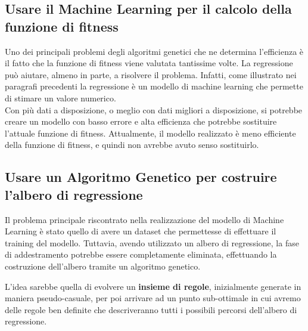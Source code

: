 \documentclass[a4paper, 11pt, oneside]{report}
\begin{document}
                \subsection{Usare il Machine Learning per il calcolo della funzione di fitness}
                Uno dei principali problemi degli algoritmi genetici che ne determina l'efficienza è il fatto che la funzione di fitness
                viene valutata tantissime volte.
                La regressione può aiutare, almeno in parte, a risolvere il problema.
                Infatti, come illustrato nei paragrafi precedenti la regressione è un modello di machine learning che permette di stimare
                un valore numerico.\\
                Con più dati a disposizione, o meglio con dati migliori a disposizione, si potrebbe creare un modello con basso errore e alta efficienza
                che potrebbe sostituire l'attuale funzione di fitness.
                Attualmente, il modello realizzato è meno efficiente della funzione di fitness, e quindi non avrebbe avuto senso sostituirlo.


                \subsection{Usare un Algoritmo Genetico per costruire l'albero di regressione}
                Il problema principale riscontrato nella realizzazione del modello di Machine Learning è stato quello di avere
                un dataset che permettesse di effettuare il training del modello.
                Tuttavia, avendo utilizzato un albero di regressione, la fase di addestramento potrebbe essere completamente eliminata,
                effettuando la costruzione dell'albero tramite un algoritmo genetico.
                \par \noindent L'idea sarebbe quella di evolvere un \textbf{insieme di regole}, inizialmente
                generate in maniera pseudo-casuale, per poi arrivare ad un punto sub-ottimale in cui avremo delle regole
                ben definite che descriveranno tutti i possibili percorsi dell'albero di regressione.
\end{document}
